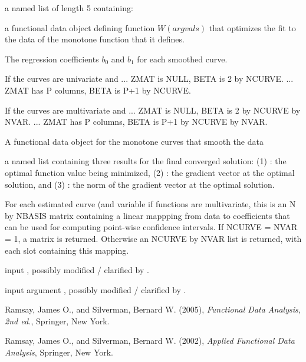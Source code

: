 \documentclass{article}
\begin{document}
\begin{Value}
a named list of length 5 containing:

\begin{ldescription}
\item[\code{Wfdobj}] a functional data object defining function $W(argvals)$ that
optimizes the fit to the data of the monotone function that it
defines.

\item[\code{beta}] The regression coefficients $b_0$ and $b_1$ for each smoothed
curve.

If the curves are univariate and
... ZMAT is NULL,       BETA is 2   by NCURVE.
... ZMAT has P columns, BETA is P+1 by NCURVE.

If the curves are multivariate and
... ZMAT is NULL,       BETA is 2   by NCURVE by NVAR.
... ZMAT has P columns, BETA is P+1 by NCURVE by NVAR.

\item[\code{yhatfd}] A functional data object for the monotone curves that smooth the
data

\item[\code{Flist}] a named list containing three results for the final converged
solution:  (1) : the optimal function value being minimized,
(2) : the gradient vector at the optimal solution, and
(3) : the norm of the gradient vector at the optimal
solution.

\item[\code{y2cMap}] For each estimated curve (and variable if functions are
multivariate, this is an N by NBASIS matrix containing a linear
mappping from data to coefficients that can be used for computing
point-wise confidence intervals.  If NCURVE = NVAR = 1, a matrix is
returned.  Otherwise an NCURVE by NVAR list is returned, with each
slot containing this mapping.

\item[\code{argvals}] input , possibly modified / clarified by
.

\item[\code{y}] input argument , possibly modified / clarified by
.

\end{ldescription}
\end{Value}
\begin{References}\relax
Ramsay, James O., and Silverman, Bernard W. (2005), \emph{Functional
Data Analysis, 2nd ed.}, Springer, New York.

Ramsay, James O., and Silverman, Bernard W. (2002), \emph{Applied
Functional Data Analysis}, Springer, New York.
\end{References}
\end{document}
